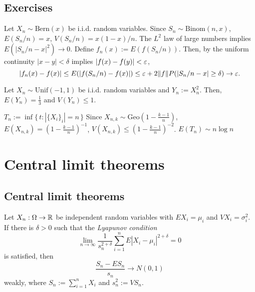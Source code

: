 \documentclass{../note}
\def\Unif{\mathrm{Unif}}
\def\Bern{\mathrm{Bern}}
\def\Binom{\mathrm{Binom}}
\def\Geo{\mathrm{Geo}}
\begin{document}
\section*{Exercises}
\begin{prb}
Let $X_n\sim\Bern(x)$ be i.i.d. random variables.
Since $S_n\sim\Binom(n,x)$, $E(S_n/n)=x$, $V(S_n/n)=x(1-x)/n$.
The $L^2$ law of large numbers implies $E(|S_n/n-x|^2)\to0$.
Define $f_n(x):=E(f(S_n/n))$.
Then, by the uniform continuity $|x-y|<\delta$ implies $|f(x)-f(y)|<\varepsilon$,
\[|f_n(x)-f(x)|\le E(|f(S_n/n)-f(x)|)\le\varepsilon+2\|f\|P(|S_n/n-x|\ge\delta)\to\varepsilon.\]
\end{prb}
\begin{prb}
Let $X_n\sim\Unif(-1,1)$ be i.i.d. random variables and $Y_n:=X_n^2$.
Then, $E(Y_n)=\frac13$ and $V(Y_n)\le1$.
\end{prb}
\begin{prb}
$T_n:=\inf\{\,t:|\{X_i\}_i|=n\,\}$
Since $X_{n,k}\sim\Geo(1-\frac{k-1}n)$, $E(X_{n,k})=(1-\frac{k-1}n)^{-1}$, $V(X_{n,k})\le(1-\frac{k-1}n)^{-2}$.
$E(T_n)\sim n\log n$
\end{prb}
\begin{prb}
\end{prb}
\begin{prb}
\end{prb}






\chapter{Central limit theorems}



\section{Central limit theorems}


\begin{prb}
Let $X_n:\Omega\to\mathbb{R}$ be independent random variables with $EX_i=\mu_i$ and $VX_i=\sigma_i^2$.
If there is $\delta>0$ such that the \emph{Lyapunov condition}
\[\lim_{n\to\infty}\frac1{s_n^{2+\delta}}\sum_{i=1}^nE|X_i-\mu_i|^{2+\delta}=0\]
is satisfied, then
\[\frac{S_n-ES_n}{s_n}\to N(0,1)\]
weakly, where $S_n:=\sum_{i=1}^nX_i$ and $s_n^2:=VS_n$.
\end{prb}
\end{document}
